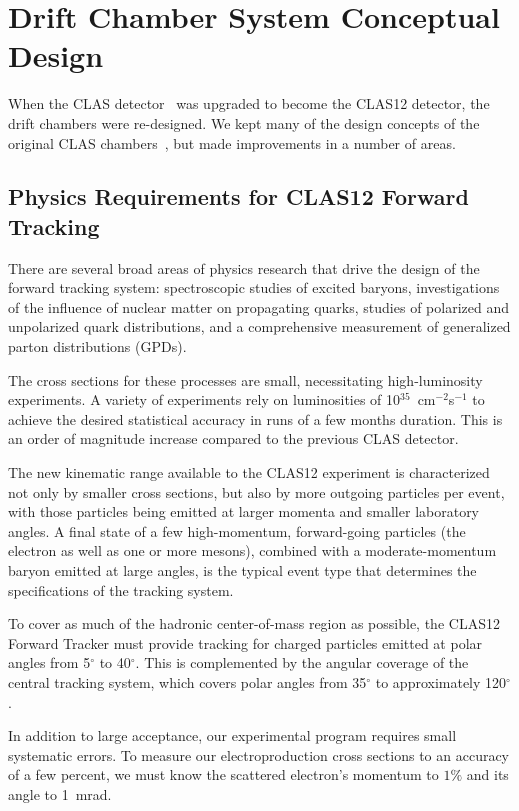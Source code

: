 \section{Drift Chamber System Conceptual Design}

When the CLAS detector~\cite{clasnim} was upgraded to become the CLAS12 detector, the
drift chambers were re-designed.  We kept many of the design concepts of the original CLAS
chambers~\cite{dcnim}, but made improvements in a number of areas.

\subsection{Physics Requirements for CLAS12 Forward Tracking}

There are several broad areas of physics research that drive 
the design of the forward tracking system: 
spectroscopic studies of excited baryons, investigations of 
the influence of nuclear matter on propagating quarks, studies of polarized 
and unpolarized quark distributions, and a comprehensive measurement of 
generalized parton distributions (GPDs). 

The cross sections for these processes are small, necessitating high-luminosity 
experiments.  A variety of experiments rely on luminosities of 
10$^{35}$~cm$^{-2}$s$^{-1}$ to achieve the desired statistical accuracy in 
runs of a few months duration.  This is an order of magnitude increase
compared to the previous CLAS detector.  

The new kinematic range available to the CLAS12 experiment is
characterized not only by smaller cross sections, but also by more outgoing 
particles per event, with those particles being emitted at larger momenta
and smaller laboratory angles.  
A final state of a few high-momentum, forward-going particles (the electron as well as one 
or more mesons), combined with a moderate-momentum baryon emitted at large 
angles, is the typical event type that determines the specifications of the 
tracking system. 

To cover as much of the hadronic center-of-mass region as possible, the CLAS12 Forward 
Tracker must provide tracking for charged particles emitted at polar angles 
from 5$^\circ$ to 40$^\circ$.  This is complemented by the angular coverage of
the central tracking system, which covers polar angles from  35$^\circ$ to approximately 120$^\circ$.

In addition to large acceptance, our experimental program requires
small systematic errors.  To measure our electroproduction cross sections
to an accuracy of a few percent, we must know the scattered electron's
momentum to $1\%$ and its angle to 1~mrad.  

